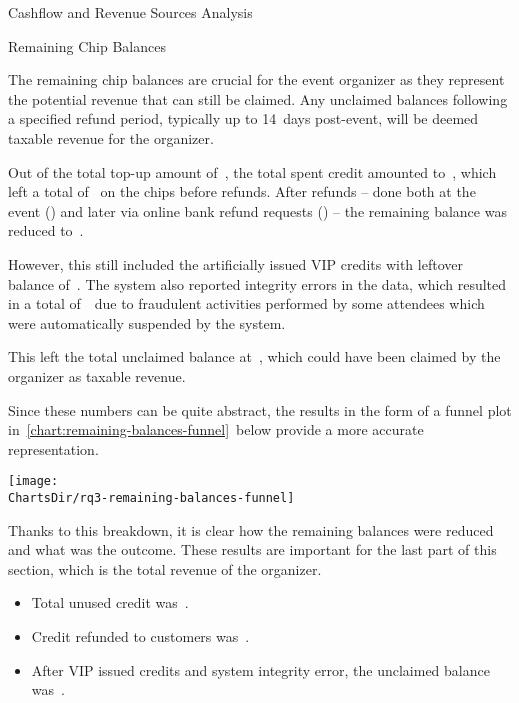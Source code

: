 \begin{section}{Cashflow and Revenue Sources Analysis}
	\begin{subsection}{Remaining Chip Balances}
		\label{subsec:analysis-remaining-balances}

		The remaining chip balances are crucial for the event organizer as they represent the potential revenue that can still be claimed.
		Any unclaimed balances following a specified refund period, typically up to 14~days post-event, will be deemed taxable revenue for the organizer.

		Out of the total top-up amount of~, the total spent credit amounted to~, which left a total of~ on the chips before refunds.
		After refunds – done both at the event () and later via online bank refund requests () – the remaining balance was reduced to~.

		However, this still included the artificially issued VIP credits with leftover balance of~.
		The system also reported integrity errors in the data, which resulted in a total of~~due to fraudulent activities performed by some attendees which were automatically suspended by the system.

		This left the total unclaimed balance at~, which could have been claimed by the organizer as taxable revenue.

		Since these numbers can be quite abstract, the results in the form of a funnel plot in~\autoref{chart:remaining-balances-funnel}~below provide a more accurate representation.

		\begin{chart}[h]
			\centering
			\texttt{[image: \\ChartsDir/rq3-remaining-balances-funnel]}
			\caption{ Remaining Chip Balances Funnel}
			\label{chart:remaining-balances-funnel}
			\source
		\end{chart}

		Thanks to this breakdown, it is clear how the remaining balances were reduced and what was the outcome.
		These results are important for the last part of this section, which is the total revenue of the organizer.

		\begin{keytakeaways}
			\begin{itemize}
				\item Total unused credit was~.
				\item Credit refunded to customers was~.
				\item After VIP issued credits and system integrity error, the unclaimed balance was~.
			\end{itemize}
		\end{keytakeaways}
	\end{subsection}


\end{section}
